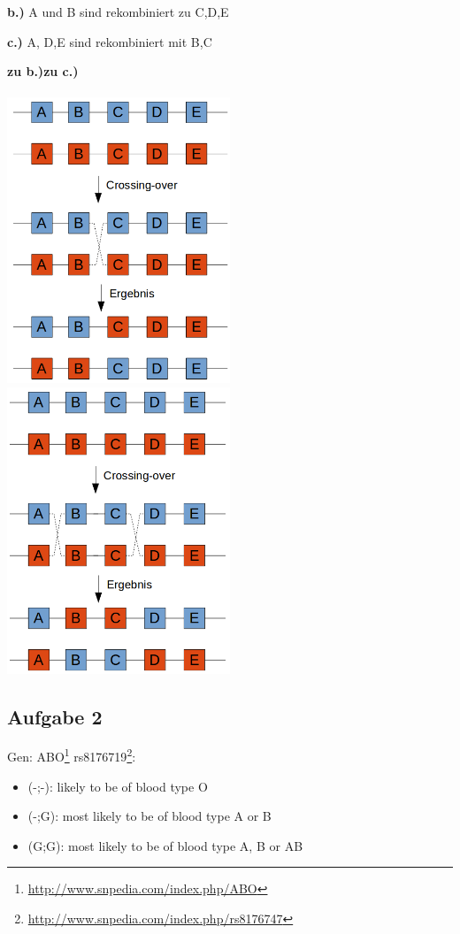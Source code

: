 \documentclass[13pt,a4paper]{article}
\begin{document}
\textbf{b.)} A und B sind rekombiniert zu C,D,E

\textbf{c.)} A, D,E sind rekombiniert mit B,C

\textbf{zu b.)}\hspace*{65mm}\textbf{zu c.)}\\\\
\includegraphics[width=0.5\textwidth]{pix/exercise2/crossing_over_b.png}
\includegraphics[width=0.5\textwidth]{pix/exercise2/crossing_over_c.png}

\subsection{Aufgabe 2}
Gen: ABO\footnote{\url{http://www.snpedia.com/index.php/ABO}}
rs8176719\footnote{\url{http://www.snpedia.com/index.php/rs8176747}}:
\begin{itemize}
	\item (-;-): likely to be of blood type O
	\item (-;G): most likely to be of blood type A or B
	\item (G;G): most likely to be of blood type A, B or AB 
\end{itemize}
\end{document}
